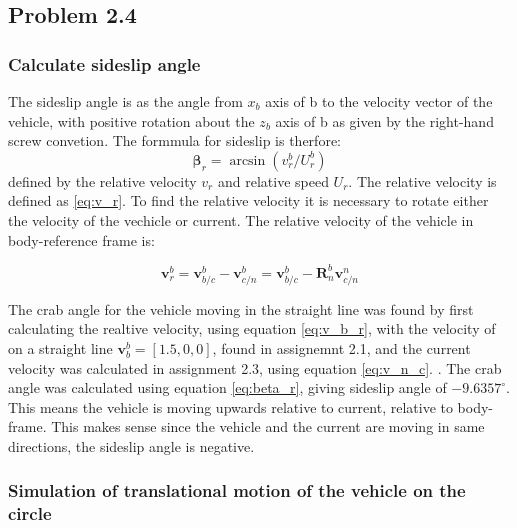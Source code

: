 
\subsection*{Problem 2.4}

\subsubsection*{Calculate sideslip angle}

The sideslip angle is as the angle from $x_b$ axis of {b} to the velocity vector of the vehicle, with positive rotation about the $z_b$ axis of {b} as given by the right-hand screw convetion. The formmula for sideslip is therfore:
\begin{equation}
    \boldsymbol{\beta}_r = \arcsin( v^b_r/U^b_r)
    \label{eq:beta_r}
\end{equation}
defined by the relative velocity $v_r$ and relative speed $U_r$. The relative velocity is defined as \eqref{eq:v_r}. To find the relative velocity it is necessary to rotate either the velocity of the vechicle or current. The relative velocity of the vehicle in body-reference frame is:

\begin{equation}
    \boldsymbol{v}^b_r = \boldsymbol{v}^b_{b/c} - \boldsymbol{v}^{b}_{c/n} =  \boldsymbol{v}^b_{b/c} - \mathbf{R}^b_n \boldsymbol{v}^{n}_{c/n} 
    \label{eq:v_b_r}
\end{equation}

The crab angle for the vehicle moving in the straight line was found by first calculating the realtive velocity, using equation \eqref{eq:v_b_r}, with  the velocity of  on a straight line  $\mathbf{v}_b^b = [1.5, 0, 0]$, found in assignemnt 2.1, and   the current velocity was calculated in assignment 2.3, using equation \eqref{eq:v_n_c}. . The crab angle was calculated using equation \eqref{eq:beta_r}, giving sideslip angle of $-9.6357 ^\circ$.  This means the vehicle is moving upwards relative to current, relative to body-frame. This makes sense since the vehicle and the current are moving in same directions, the sideslip angle is negative. 

\subsubsection{Simulation of translational motion of the vehicle on the circle}

